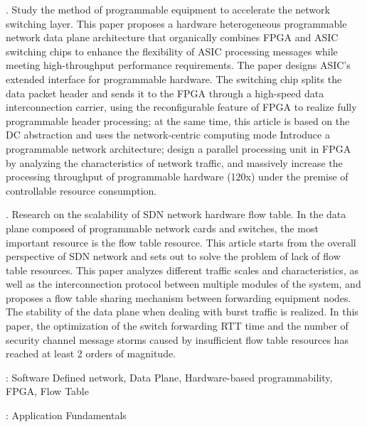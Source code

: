 . Study the method of programmable equipment to accelerate the network switching layer. This paper proposes a hardware heterogeneous programmable network data plane architecture that organically combines FPGA and ASIC switching chips to enhance the flexibility of ASIC processing messages while meeting high-throughput performance requirements. The paper designs ASIC's extended interface for programmable hardware. The switching chip splits the data packet header and sends it to the FPGA through a high-speed data interconnection carrier, using the reconfigurable feature of FPGA to realize fully programmable header processing; at the same time, this article is based on the DC abstraction and uses the network-centric computing mode Introduce a programmable network architecture; design a parallel processing unit in FPGA by analyzing the characteristics of network traffic, and massively increase the processing throughput of programmable hardware (120x) under the premise of controllable resource consumption. \newline

. Research on the scalability of SDN network hardware flow table. In the data plane composed of programmable network cards and switches, the most important resource is the flow table resource. This article starts from the overall perspective of SDN network and sets out to solve the problem of lack of flow table resources. This paper analyzes different traffic scales and characteristics, as well as the interconnection protocol between multiple modules of the system, and proposes a flow table sharing mechanism between forwarding equipment nodes. The stability of the data plane when dealing with burst traffic is realized. In this paper, the optimization of the switch forwarding RTT time and the number of security channel message storms caused by insufficient flow table resources has reached at least 2 orders of magnitude. \newline


\vspace{\baselineskip}
: Software Defined network, Data Plane, Hardware-based programmability, FPGA, Flow Table



\vspace{\baselineskip}
: Application Fundamentals

\clearpage
